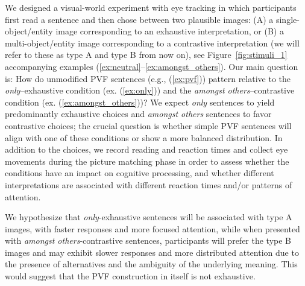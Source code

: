 \documentclass[a4paper, ruler]{CUP-JNL-LIN}%
\begin{document}
We designed a visual-world experiment with eye tracking in which participants first read a sentence and then chose between two plausible images: (A) a single-object/entity image corresponding to an exhaustive interpretation, or (B) a multi-object/entity image corresponding to a contrastive interpretation (we will refer to these as type A and type B from now on), see Figure~\ref{fig:stimuli_1} accompanying examples (\ref{ex:neutral}--\ref{ex:amongst_others}). Our main question is: How do unmodified PVF sentences (e.g., (\ref{ex:pvf})) pattern relative to the \textit{only}--exhaustive condition (ex. (\ref{ex:only})) and the \textit{amongst others}--contrastive condition (ex. (\ref{ex:amongst_others}))? We expect \textit{only} sentences to yield predominantly exhaustive choices and \textit{amongst others} sentences to favor contrastive choices; the crucial question is whether simple PVF sentences will align with one of these conditions or show a more balanced distribution. 
In addition to the choices, we record reading and reaction times and collect eye movements during the picture matching phase in order to assess whether the conditions have an impact on cognitive processing, and whether different interpretations are associated with different reaction times and/or patterns of attention. 

We hypothesize that \textit{only}-exhaustive sentences will be associated with type A images, with faster responses and more focused attention, while when presented with \textit{amongst others}-contrastive sentences, participants will prefer the type B images and may exhibit slower responses and more distributed attention due to the presence of alternatives and the ambiguity of the underlying meaning. This would suggest that the PVF construction in itself is not exhaustive.


\end{document}
